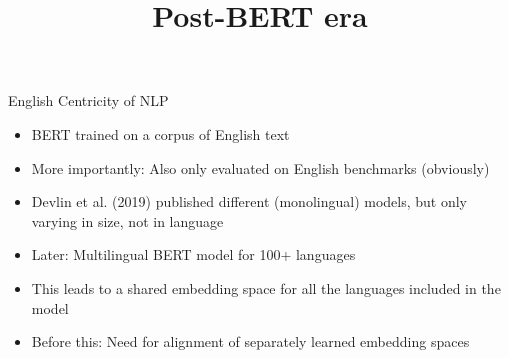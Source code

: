 



\newcommand{\titlefigure}{figure/bertology.png}
\newcommand{\learninggoals}{
\item Understand how impactful this architecture was
\item See how this changed research in the field}

\title{Post-BERT era}
\date{}




\begin{frame}{English Centricity of NLP}

\vfill

	\begin{itemize}
		\item BERT trained on a corpus of English text
		\item More importantly: Also only evaluated on English benchmarks (obviously)
		\item Devlin et al. (2019) published different (monolingual) models, but only varying in size, not in language
		\item Later: Multilingual BERT model  for 100+ languages
		\item This leads to a shared embedding space for all the languages included in the model
		\item Before this: Need for alignment of separately learned embedding spaces
	\end{itemize}

\vfill

\end{frame}


